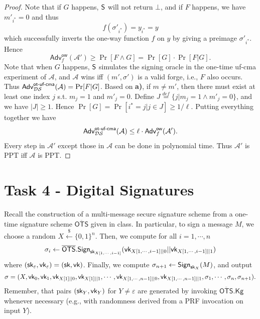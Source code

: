 \documentclass[12pt]{article}
\newcommand{\eqdef}{\stackrel{def}{=}}
\newcommand{\bits}{\{0,1\}}
\newcommand{\getsr}{\stackrel{\$}{\gets}}
\newcommand{\Adv}{\textsf{Adv}}
\theoremstyle{definition}
\newcommand{\Kg}{\textsf{Kg}}
\newcommand{\sk}{\textsf{sk}}
\newcommand{\A}{\mathcal{A}}
\begin{document}
\begin{proof}
Note that if $G$ happens, $\textsf{S}$ will not return $\bot$, and if $F$ happens, we have $m'_{i^*} = 0$ and thus
$$f(\sigma'_{i^*}) = y_{i^*} = y$$
which successfully inverts the one-way function $f$ on $y$ by giving a preimage $\sigma'_{i^*}$. 
Hence
$$\Adv_{f}^{\textsf{ow}}(\A') \geq \Pr[F\wedge G] = \Pr[G]\cdot\Pr[F|G].$$
Note that when $G$ happens, $\textsf{S}$ simulates the signing oracle in the one-time uf-cma experiment of $\A$, and $\A$ wins iff $(m',\sigma')$ is a valid forge, i.e., $F$ also occurs. Thus $\Adv_{\DS}^{\textsf{ot-uf-cma}}(\A) = \Pr[F|G]$.
Based on {\bf a)}, if $m\not=m'$, then there must exist at least one index $j$ s.t. $m_j=1$ and $m'_j=0$. Define $J \eqdef \{j|m_j=1 \wedge m'_j=0\}$, and we have $|J|\geq 1$. Hence $\Pr[G] = \Pr[i^* = j|j\in J] \geq 1/\ell$. Putting everything together we have
$$\Adv_{\DS}^{\textsf{ot-uf-cma}}(\A) \leq \ell\cdot\Adv_{f}^{\textsf{ow}}(\A').$$
Every step in $\A'$ except those in $\A$ can be done in polynomial time. Thus $\A'$ is PPT iff $\A$ is PPT.
\end{proof}

\newcommand{\OTS}{\overline{\textsf{OTS}}}
\section{Task 4 - Digital Signatures}
Recall the construction of a multi-message secure signature scheme from a one-time signature
scheme $\OTS$ given in class. In particular, to sign a message $M$, we choose a random $X \getsr \bits^n$. Then, we compute for all $i=1,\cdots,n$
$$\sigma_i \gets \OTS.\Sign_{\sk_{X[1,\cdots,i-1]}}(\vk_{X[1,\cdots,i-1]||0} || \vk_{X[1,\cdots,i-1]||1})$$
where $(\sk_{\varepsilon}, \vk_{\varepsilon}) = (\sk, \vk)$. Finally, we compute $\sigma_{n+1} \gets \Sign_{\sk_X}(M)$, and output 
$$\sigma = (X, \textsf{vk}_0, \textsf{vk}_1, \textsf{vk}_{X[1]||0}, \textsf{vk}_{X[1]||1},\cdots,\textsf{vk}_{X[1,\cdots,n-1]||0},\textsf{vk}_{X[1,\cdots,n-1]||1}, \sigma_1,\cdots,\sigma_n,\sigma_{n+1}).$$
Remember, that pairs $(\sk_Y,\vk_Y)$ for $Y\not=\varepsilon$ are generated by invoking $\OTS.\Kg$ whenever necessary (e.g., with randomness derived from a PRF invocation on input $Y$).
\end{document}
